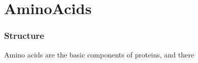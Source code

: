 
\pagebreak
\hypertarget{ChapterAminoAcids}{}
\part{AminoAcids}

	\section{Structure}

		Amino acids are the basic components of proteins, and there

